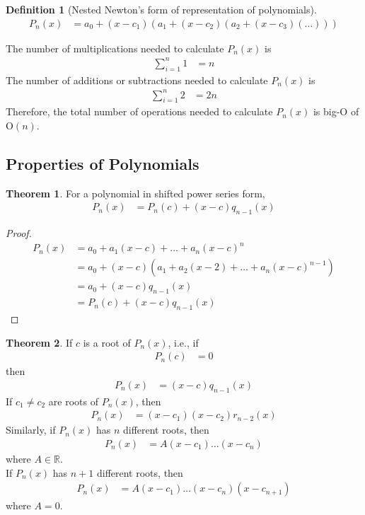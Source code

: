 \documentclass[fleqn, a4paper, 12pt, twoside]{article}
\theoremstyle{definition}
\newtheorem{definition}{Definition}
\theoremstyle{theorem}
\newtheorem{theorem}{Theorem}
\begin{document}
\begin{definition}[Nested Newton's form of representation of polynomials]
	\begin{align*}
		P_n(x) &= a_0 + (x - c_1) \left( a_1 + (x - c_2) \left( a_2 + (x - c_3) \left( \dots \right) \right) \right)
	\end{align*}
\end{definition}

The number of multiplications needed to calculate $P_n(x)$ is 
\begin{align*}
	\sum\limits_{i = 1}^{n} 1 &= n
\end{align*}
The number of additions or subtractions needed to calculate $P_n(x)$ is 
\begin{align*}
	\sum\limits_{i = 1}^{n} 2 &= 2 n
\end{align*}
Therefore, the total number of operations needed to calculate $P_n(x)$ is big-O of $\mathrm{O}(n)$.

\subsection{Properties of Polynomials}

\begin{theorem}
	For a polynomial in shifted power series form,
	\begin{align*}
		P_n(x) &= P_n(c) + (x - c) q_{n - 1}(x)
	\end{align*}
\end{theorem}

\begin{proof}
	\begin{align*}
		P_n(x) &= a_0 + a_1 (x - c) + \dots + a_n(x - c)^n\\
		&= a_0 + (x - c) \left( a_1 + a_2 (x - 2) + \dots + a_n (x - c)^{n - 1} \right)\\
		&= a_0 + (x - c) q_{n - 1}(x)\\
		&= P_n(c) + (x - c) q_{n - 1}(x)
	\end{align*}
\end{proof}

\begin{theorem}
	If $c$ is a root of $P_n(x)$, i.e., if
	\begin{align*}
		P_n(c) &= 0
	\end{align*}
	then
	\begin{align*}
		P_n(x) &= (x - c) q_{n - 1}(x)
	\end{align*}
	If $c_1 \neq c_2$ are roots of $P_n(x)$, then
	\begin{align*}
		P_n(x) &= (x - c_1) (x - c_2) r_{n - 2}(x)
	\end{align*}
	Similarly, if $P_n(x)$ has $n$ different roots, then
	\begin{align*}
		P_n(x) &= A (x - c_1) \dots (x - c_n)
	\end{align*}
	where $A \in \mathbb{R}$.\\
	If $P_n(x)$ has $n + 1$ different roots, then
	\begin{align*}
		P_n(x) &= A (x - c_1) \dots (x - c_n) (x - c_{n + 1})
	\end{align*}
	where $A = 0$.
\end{theorem}
\end{document}
